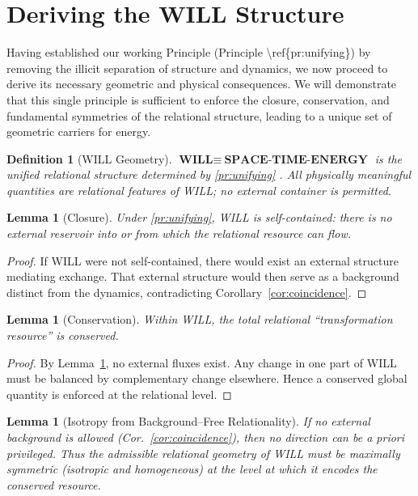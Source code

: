 \documentclass[12pt, a4paper]{article}
\newtheorem{lemma}[theorem]{Lemma}
\newtheorem{definition}[theorem]{Definition}
\begin{document}
\section{Deriving the WILL Structure}

Having established our working Principle (Principle \textbackslash{}ref\{pr:unifying\}) by removing the illicit separation of structure and dynamics, we now proceed to derive its necessary geometric and physical consequences. We will demonstrate that this single principle is sufficient to enforce the closure, conservation, and fundamental symmetries of the relational structure, leading to a unique set of geometric carriers for energy.

\begin{definition}[WILL Geometry]
\label{def:will}
\emph{$ \textbf{WILL}\equiv\ \textbf{SPACE-TIME-ENERGY} $} is the unified relational structure determined by \ref{pr:unifying} . All physically meaningful quantities are relational features of WILL; no external container is permitted.
\end{definition}

\begin{lemma}[Closure]
\label{lem:closure}
Under  \ref{pr:unifying}, WILL is self-contained: there is no external reservoir into or from which the relational resource can flow.
\end{lemma}

\begin{proof}
If WILL were not self-contained, there would exist an external structure mediating exchange. That external structure would then serve as a background distinct from the dynamics, contradicting Corollary~\ref{cor:coincidence}.  
\end{proof}

\begin{lemma}[Conservation]
\label{lem:conservation}
Within WILL, the total relational ``transformation resource'' is conserved.
\end{lemma}

\begin{proof}
By Lemma~\ref{lem:closure}, no external fluxes exist. Any change in one part of WILL must be balanced by complementary change elsewhere. Hence a conserved global quantity is enforced at the relational level.  
\end{proof}

\begin{lemma}[Isotropy from Background--Free Relationality]
\label{lem:isotropy}
If no external background is allowed (Cor.~\ref{cor:coincidence}), then no direction can be \emph{a priori} privileged. Thus the admissible relational geometry of WILL must be maximally symmetric (isotropic and homogeneous) at the level at which it encodes the conserved resource.
\end{lemma}
\end{document}
